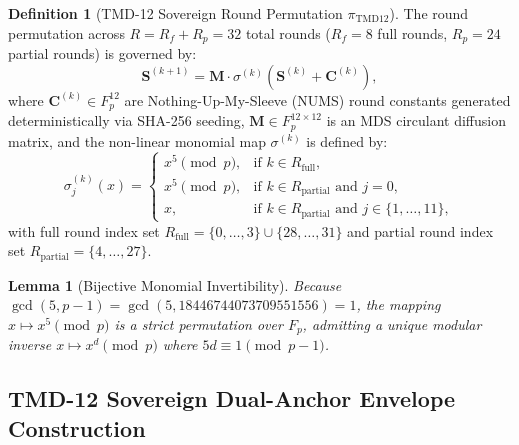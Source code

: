 \documentclass[11pt,a4paper,reqno]{article}
\def\mathcal#1{#1}%
\def\mathbb#1{#1}%
\theoremstyle{plain}
\newtheorem{lemma}[theorem]{Lemma}
\theoremstyle{definition}
\newtheorem{definition}[theorem]{Definition}
\theoremstyle{remark}
\numberwithin{equation}{section}
\begin{document}
\begin{definition}[{TMD-12 Sovereign Round Permutation $\pi_{\text{TMD12}}$}]
The round permutation across $R = R_f + R_p = 32$ total rounds ($R_f = 8$ full rounds, $R_p = 24$ partial rounds) is governed by:
\begin{equation}
\label{eq:sponge_round_formal}
\mathbf{S}^{(k+1)} = \mathbf{M} \cdot \sigma^{(k)}\left(\mathbf{S}^{(k)} + \mathbf{C}^{(k)}\right),
\end{equation}
where $\mathbf{C}^{(k)} \in \mathbb{F}_p^{12}$ are Nothing-Up-My-Sleeve (NUMS) round constants generated deterministically via SHA-256 seeding, $\mathbf{M} \in \mathbb{F}_p^{12 \times 12}$ is an MDS circulant diffusion matrix, and the non-linear monomial map $\sigma^{(k)}$ is defined by:
\begin{equation}
\label{eq:sbox_piecewise}
\sigma_j^{(k)}(x) = \begin{cases}
x^5 \pmod{p}, & \text{if } k \in \mathcal{R}_{\text{full}}, \\
x^5 \pmod{p}, & \text{if } k \in \mathcal{R}_{\text{partial}} \text{ and } j = 0, \\
x, & \text{if } k \in \mathcal{R}_{\text{partial}} \text{ and } j \in \{1,\dots,11\},
\end{cases}
\end{equation}
with full round index set $\mathcal{R}_{\text{full}} = \{0,\dots,3\} \cup \{28,\dots,31\}$ and partial round index set $\mathcal{R}_{\text{partial}} = \{4,\dots,27\}$.
\end{definition}

\begin{lemma}[{Bijective Monomial Invertibility}]
Because $\gcd(5, p - 1) = \gcd(5, 18446744073709551556) = 1$, the mapping $x \mapsto x^5 \pmod{p}$ is a strict permutation over $\mathbb{F}_p$, admitting a unique modular inverse $x \mapsto x^d \pmod{p}$ where $5d \equiv 1 \pmod{p-1}$.
\end{lemma}

\subsection{\texorpdfstring{TMD-12 Sovereign Dual-Anchor Envelope Construction}{TMD-12 Sovereign Dual-Anchor Envelope Construction}}
\end{document}
